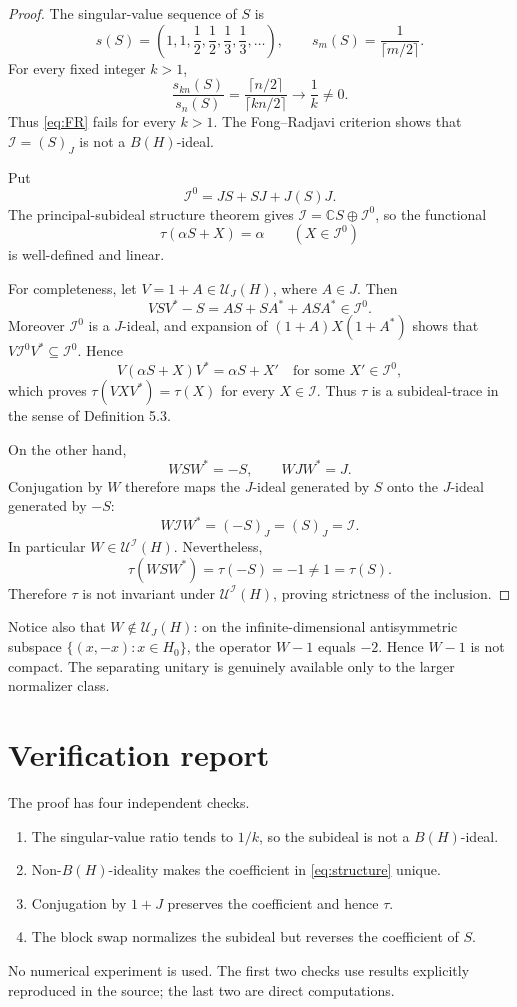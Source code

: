 \documentclass[11pt]{article}
\newcommand{\BH}{B(H)}
\newcommand{\cI}{\mathcal I}
\newcommand{\UU}{\mathcal U}
\begin{document}
\begin{proof}
The singular-value sequence of $S$ is
\[
 s(S)=\left(1,1,\frac12,\frac12,\frac13,\frac13,\ldots\right),
 \qquad s_m(S)=\frac1{\lceil m/2\rceil}.
\]
For every fixed integer $k>1$,
\[
 \frac{s_{kn}(S)}{s_n(S)}
 =\frac{\lceil n/2\rceil}{\lceil kn/2\rceil}
 \longrightarrow\frac1k\neq0.
\]
Thus \eqref{eq:FR} fails for every $k>1$.  The Fong--Radjavi criterion shows
that $\cI=(S)_J$ is not a $\BH$-ideal.

Put
\[
 \cI^0=JS+SJ+J(S)J.
\]
The principal-subideal structure theorem gives
$\cI=\mathbb C S\oplus\cI^0$, so the functional
\[
 \tau(\alpha S+X)=\alpha\qquad(X\in\cI^0)
\]
is well-defined and linear.

For completeness, let $V=1+A\in\UU_J(H)$, where $A\in J$.  Then
\[
 VSV^*-S=AS+SA^*+ASA^*\in\cI^0.
\]
Moreover $\cI^0$ is a $J$-ideal, and expansion of
$(1+A)X(1+A^*)$ shows that $V\cI^0V^*\subseteq\cI^0$.  Hence
\[
 V(\alpha S+X)V^*=\alpha S+X'
 \quad\text{for some }X'\in\cI^0,
\]
which proves $\tau(VXV^*)=\tau(X)$ for every $X\in\cI$.  Thus $\tau$ is a
subideal-trace in the sense of Definition 5.3.

On the other hand,
\[
 WSW^*=-S,
 \qquad WJW^*=J.
\]
Conjugation by $W$ therefore maps the $J$-ideal generated by $S$ onto the
$J$-ideal generated by $-S$:
\[
 W\cI W^*=(-S)_J=(S)_J=\cI.
\]
In particular $W\in\UU^{\cI}(H)$.  Nevertheless,
\[
 \tau(WSW^*)=\tau(-S)=-1\neq1=\tau(S).
\]
Therefore $\tau$ is not invariant under $\UU^{\cI}(H)$, proving strictness of
the inclusion.
\end{proof}

Notice also that $W\notin\UU_J(H)$: on the infinite-dimensional antisymmetric
subspace $\{(x,-x):x\in H_0\}$, the operator $W-1$ equals $-2$.  Hence $W-1$
is not compact.  The separating unitary is genuinely available only to the
larger normalizer class.

\section{Verification report}

The proof has four independent checks.
\begin{enumerate}
\item The singular-value ratio tends to $1/k$, so the subideal is not a
$\BH$-ideal.
\item Non-$\BH$-ideality makes the coefficient in \eqref{eq:structure} unique.
\item Conjugation by $1+J$ preserves the coefficient and hence $\tau$.
\item The block swap normalizes the subideal but reverses the coefficient of
$S$.
\end{enumerate}
No numerical experiment is used.  The first two checks use results explicitly
reproduced in the source; the last two are direct computations.
\end{document}

